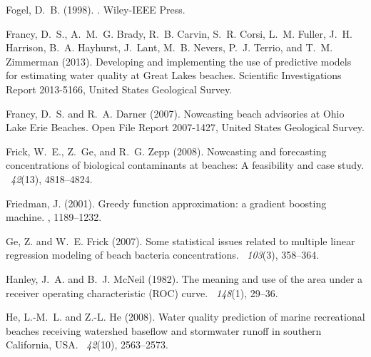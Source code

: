 \documentclass[authoryear,review, 12pt]{elsarticle}
\begin{document}
\begin{thebibliography}{}
Fogel, D.~B. (1998).
.
\newblock Wiley-IEEE Press.

Francy, D.~S., A.~M.~G. Brady, R.~B. Carvin, S.~R. Corsi, L.~M. Fuller, J.~H.
  Harrison, B.~A. Hayhurst, J.~Lant, M.~B. Nevers, P.~J. Terrio, and T.~M.
  Zimmerman (2013).
\newblock Developing and implementing the use of predictive models for
  estimating water quality at {G}reat {L}akes beaches.
\newblock Scientific Investigations Report 2013-5166, United States Geological
  Survey.

Francy, D.~S. and R.~A. Darner (2007).
\newblock Nowcasting beach advisories at {Ohio Lake Erie Beaches}.
\newblock Open File Report 2007-1427, United States Geological Survey.

Frick, W.~E., Z.~Ge, and R.~G. Zepp (2008).
\newblock Nowcasting and forecasting concentrations of biological contaminants
  at beaches: A feasibility and case study.
~{\em 42\/}(13),
  4818--4824.

Friedman, J. (2001).
\newblock Greedy function approximation: a gradient boosting machine.
, 1189--1232.

Ge, Z. and W.~E. Frick (2007).
\newblock Some statistical issues related to multiple linear regression
  modeling of beach bacteria concentrations.
~{\em 103\/}(3), 358--364.

Hanley, J.~A. and B.~J. McNeil (1982).
\newblock The meaning and use of the area under a receiver operating
  characteristic ({ROC}) curve.
~{\em 148\/}(1), 29--36.

He, L.-M.~L. and Z.-L. He (2008).
\newblock Water quality prediction of marine recreational beaches receiving
  watershed baseflow and stormwater runoff in southern {C}alifornia, {USA}.
~{\em 42\/}(10), 2563--2573.


\end{thebibliography}
\end{document}
